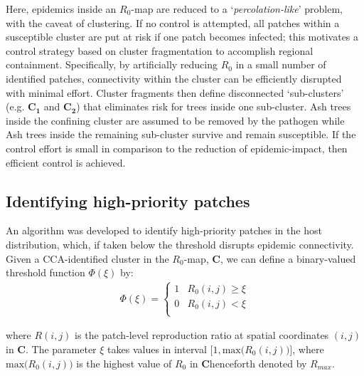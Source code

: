 Here, epidemics inside an $R_0$-map are reduced to a `\textit{percolation-like}' problem, with the caveat of clustering. 
If no control is attempted, all patches within a susceptible cluster are put at risk if one patch becomes infected;
this motivates a control strategy based on cluster fragmentation to accomplish regional containment.
Specifically, by artificially reducing $R_0$ in a small number of identified patches, connectivity within the cluster can be efficiently disrupted with minimal effort.
Cluster fragments then define disconnected `sub-clusters' (e.g. $\mathbf{C_1}$ and $\mathbf{C_2}$) that eliminates risk for trees inside one sub-cluster.
Ash trees inside the confining cluster are assumed to be removed by the pathogen while Ash trees inside the remaining sub-cluster survive and remain susceptible.
If the control effort is small in comparison to the reduction of epidemic-impact, then efficient control is achieved.


\subsection{Identifying high-priority patches}

An algorithm was developed to identify high-priority patches in the host distribution, which, if taken below the threshold disrupts epidemic connectivity.
Given a CCA-identified cluster in the $R_0$-map, $\mathbf{C}$, we can define a binary-valued threshold function $\Phi(\xi)$ by:
\begin{align}
\label{eq:xi-step}
\Phi(\xi) = \left\{ \begin{array}{cc} 
                1 & R_0(i, j) \geq \xi \\
                0 & R_0(i, j) < \xi \\
                \end{array} \right.
\end{align}

where $R(i,j)$ is the patch-level reproduction ratio at spatial coordinates $(i,j)$ in $\mathbf{C}$.
The parameter $\xi$ takes values in interval $\big[1, \mathrm{max}\big( R_0(i,j)\big) \big]$, 
where $\mathrm{max}\big(R_0(i, j)\big)$ is the highest value of $R_0$ in $\mathbf{C}$\textemdash henceforth denoted by $R_{max}$.

